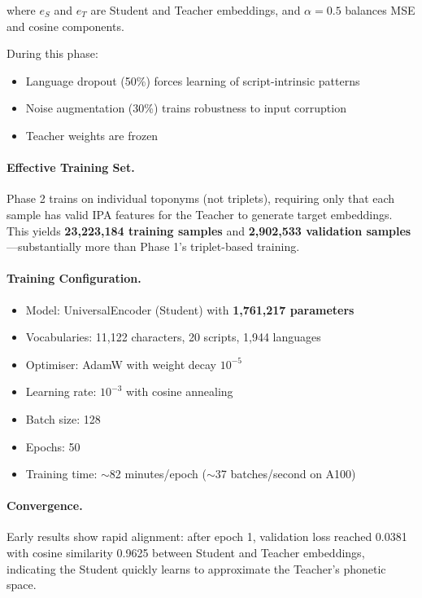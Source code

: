 \documentclass[11pt,a4paper]{article}
\begin{document}
where $e_S$ and $e_T$ are Student and Teacher embeddings, and $\alpha = 0.5$ balances MSE and cosine components.

During this phase:
\begin{itemize}
    \item Language dropout (50\%) forces learning of script-intrinsic patterns
    \item Noise augmentation (30\%) trains robustness to input corruption
    \item Teacher weights are frozen
\end{itemize}

\paragraph{Effective Training Set.} Phase 2 trains on individual toponyms (not triplets), requiring only that each sample has valid IPA features for the Teacher to generate target embeddings. This yields \textbf{23,223,184 training samples} and \textbf{2,902,533 validation samples}---substantially more than Phase 1's triplet-based training.

\paragraph{Training Configuration.}
\begin{itemize}
    \item Model: UniversalEncoder (Student) with \textbf{1,761,217 parameters}
    \item Vocabularies: 11,122 characters, 20 scripts, 1,944 languages
    \item Optimiser: AdamW with weight decay $10^{-5}$
    \item Learning rate: $10^{-3}$ with cosine annealing
    \item Batch size: 128
    \item Epochs: 50
    \item Training time: $\sim$82 minutes/epoch ($\sim$37 batches/second on A100)
\end{itemize}

\paragraph{Convergence.} Early results show rapid alignment: after epoch 1, validation loss reached 0.0381 with cosine similarity 0.9625 between Student and Teacher embeddings, indicating the Student quickly learns to approximate the Teacher's phonetic space.
\end{document}
